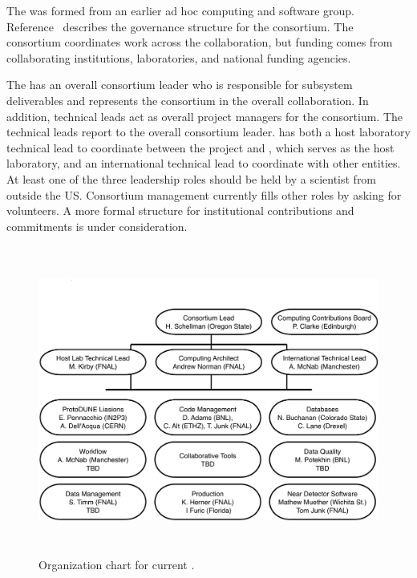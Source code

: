 The  was formed from an earlier ad hoc  computing and software group. %
Reference~\cite{bib:docdb12751} describes the governance structure for the consortium.  The consortium coordinates work across the collaboration, but funding comes from collaborating institutions, laboratories, and national funding agencies. %

The %
 has an overall consortium leader %
who is responsible for subsystem deliverables and represents the consortium in the overall  collaboration.
In addition, technical leads act as overall project managers for the consortium. The technical leads report to the overall consortium leader.
 has both a host laboratory technical lead to coordinate between the  project and \fnal, which serves as the host laboratory, and an international  technical lead to coordinate with other entities.
At least one of the three leadership roles should be held by a scientist from outside the US. 
Consortium management currently fills other roles by asking for volunteers.  A more formal structure for institutional contributions and commitments is under consideration. 


\begin{figure}[htp]
\centering
\includegraphics[height=4in]{graphics/comp-org-chart.pdf}
\caption[Organization chart for current ]{Organization chart for current . }
\label{fig:ch-exec-comp-org-es}
\end{figure}


